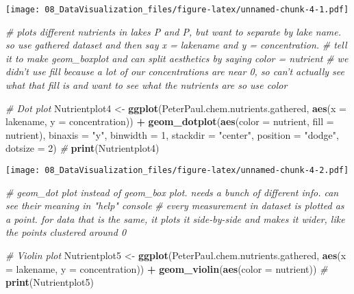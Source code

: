 \documentclass[]{article}
\newenvironment{Shaded}{\begin{snugshade}}{\end{snugshade}}
\newcommand{\KeywordTok}[1]{\textcolor[rgb]{0.13,0.29,0.53}{\textbf{#1}}}
\newcommand{\DataTypeTok}[1]{\textcolor[rgb]{0.13,0.29,0.53}{#1}}
\newcommand{\DecValTok}[1]{\textcolor[rgb]{0.00,0.00,0.81}{#1}}
\newcommand{\StringTok}[1]{\textcolor[rgb]{0.31,0.60,0.02}{#1}}
\newcommand{\CommentTok}[1]{\textcolor[rgb]{0.56,0.35,0.01}{\textit{#1}}}
\newcommand{\OperatorTok}[1]{\textcolor[rgb]{0.81,0.36,0.00}{\textbf{#1}}}
\newcommand{\NormalTok}[1]{#1}
\begin{document}
\texttt{[image: 08\_DataVisualization\_files/figure-latex/unnamed-chunk-4-1.pdf]}

\begin{Shaded}
\begin{Highlighting}[]
\CommentTok{# plots different nutrients in lakes P and P, but want to separate by lake name. so use gathered dataset and then say x = lakename and y = concentration.}
\CommentTok{# tell it to make geom_boxplot and can split aesthetics by saying color = nutrient}
\CommentTok{# we didn't use fill because a lot of our concentrations are near 0, so can't actually see what that fill is and want to see what the nutrients are so use color}

\CommentTok{# Dot plot}
\NormalTok{Nutrientplot4 <-}
\StringTok{  }\KeywordTok{ggplot}\NormalTok{(PeterPaul.chem.nutrients.gathered, }\KeywordTok{aes}\NormalTok{(}\DataTypeTok{x =}\NormalTok{ lakename, }\DataTypeTok{y =}\NormalTok{ concentration)) }\OperatorTok{+}
\StringTok{  }\KeywordTok{geom_dotplot}\NormalTok{(}\KeywordTok{aes}\NormalTok{(}\DataTypeTok{color =}\NormalTok{ nutrient, }\DataTypeTok{fill =}\NormalTok{ nutrient), }\DataTypeTok{binaxis =} \StringTok{"y"}\NormalTok{, }\DataTypeTok{binwidth =} \DecValTok{1}\NormalTok{, }
               \DataTypeTok{stackdir =} \StringTok{"center"}\NormalTok{, }\DataTypeTok{position =} \StringTok{"dodge"}\NormalTok{, }\DataTypeTok{dotsize =} \DecValTok{2}\NormalTok{) }\CommentTok{#}
\KeywordTok{print}\NormalTok{(Nutrientplot4)}
\end{Highlighting}
\end{Shaded}

\texttt{[image: 08\_DataVisualization\_files/figure-latex/unnamed-chunk-4-2.pdf]}

\begin{Shaded}
\begin{Highlighting}[]
\CommentTok{# geom_dot plot instead of geom_box plot. needs a bunch of different info. can see their meaning in "help" console}
\CommentTok{# every measurement in dataset is plotted as a point. for data that is the same, it plots it side-by-side and makes it wider, like the points clustered around 0}

\CommentTok{# Violin plot}
\NormalTok{Nutrientplot5 <-}
\StringTok{  }\KeywordTok{ggplot}\NormalTok{(PeterPaul.chem.nutrients.gathered, }\KeywordTok{aes}\NormalTok{(}\DataTypeTok{x =}\NormalTok{ lakename, }\DataTypeTok{y =}\NormalTok{ concentration)) }\OperatorTok{+}
\StringTok{  }\KeywordTok{geom_violin}\NormalTok{(}\KeywordTok{aes}\NormalTok{(}\DataTypeTok{color =}\NormalTok{ nutrient)) }\CommentTok{#}
\KeywordTok{print}\NormalTok{(Nutrientplot5)}
\end{Highlighting}
\end{Shaded}
\end{document}
